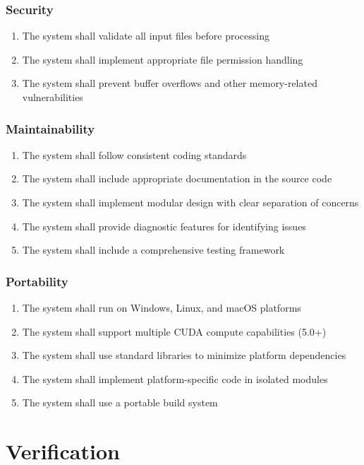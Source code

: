 \documentclass[conference]{IEEEtran}
\begin{document}
\subsubsection{Security}
\begin{enumerate}
    \item The system shall validate all input files before processing
    \item The system shall implement appropriate file permission handling
    \item The system shall prevent buffer overflows and other memory-related vulnerabilities
\end{enumerate}

\subsubsection{Maintainability}
\begin{enumerate}
    \item The system shall follow consistent coding standards
    \item The system shall include appropriate documentation in the source code
    \item The system shall implement modular design with clear separation of concerns
    \item The system shall provide diagnostic features for identifying issues
    \item The system shall include a comprehensive testing framework
\end{enumerate}

\subsubsection{Portability}
\begin{enumerate}
    \item The system shall run on Windows, Linux, and macOS platforms
    \item The system shall support multiple CUDA compute capabilities (5.0+)
    \item The system shall use standard libraries to minimize platform dependencies
    \item The system shall implement platform-specific code in isolated modules
    \item The system shall use a portable build system
\end{enumerate}

\section{Verification}
\end{document}
